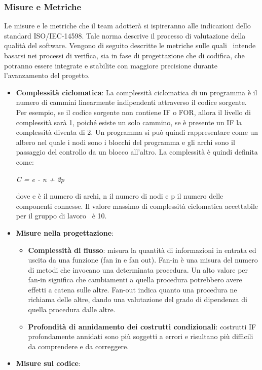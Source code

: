 \subsubsection{Misure e Metriche}
Le misure e le metriche che il team adotterà si ispireranno alle indicazioni dello standard ISO/IEC-14598. Tale norma descrive il processo di valutazione della qualità del software. Vengono di seguito descritte le metriche sulle quali \gruppo\ intende basarsi nei processi di verifica, sia in fase di progettazione che di codifica, che potranno essere integrate e stabilite con maggiore precisione durante l'avanzamento del progetto.
\begin{itemize}
    \item \textbf{Complessità ciclomatica}:
    La complessità ciclomatica di un programma è il
    numero di cammini linearmente indipendenti attraverso il codice sorgente. Per esempio, se il codice sorgente non contiene IF o FOR, allora il livello di complessità sarà 1, poiché esiste un solo 
    cammino, se è presente un IF la complessità diventa di 2. Un programma si può quindi rappresentare come un albero nel quale i nodi sono i blocchi del programma e gli archi sono il passaggio del controllo da un blocco all'altro. La complessità è quindi definita come:
    \begin{center}
    	\textit{C = e - n + 2p}
    \end{center}
    dove e è il numero di archi, n il numero di nodi e p il numero delle componenti connesse. Il valore massimo di complessità ciclomatica accettabile per il gruppo di lavoro \gruppo\ è 10.
	\item \textbf{Misure nella progettazione}:
	\begin{itemize}
		\item \textbf{Complessità di flusso}: 
		misura la quantità di informazioni in entrata ed uscita da una funzione (fan in e fan out). Fan-in è una misura del numero di metodi che invocano una determinata procedura. Un alto valore per fan-in significa che cambiamenti a quella procedura potrebbero avere effetti a catena sulle altre. Fan-out indica quanto una procedura ne richiama delle altre, dando una valutazione del grado di dipendenza di quella procedura dalle altre.
		\item \textbf{Profondità di annidamento dei costrutti condizionali}: costrutti IF profondamente annidati sono più soggetti a errori e risultano più difficili da
		comprendere e da correggere.
	\end{itemize}
	\item \textbf{Misure sul codice}:

\end{itemize}
